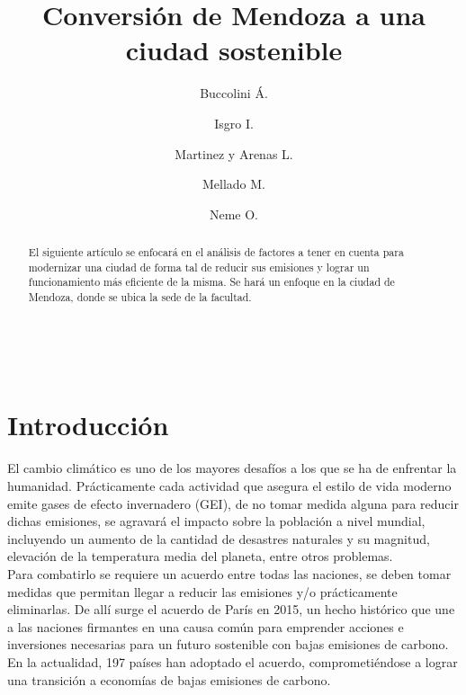\documentclass[runningheads]{llncs}
\begin{document}
%
\title{Conversión de Mendoza a una ciudad sostenible}
%
%
\author{Buccolini Á. \and Isgro I. \and
Martinez y Arenas L. \and Mellado M. \and
Neme O.}
%

%
\\

%
\maketitle        %
%
\begin{abstract}
El siguiente artículo se enfocará en el análisis de factores a tener en cuenta para modernizar una ciudad de forma tal de reducir sus emisiones y lograr un funcionamiento más eficiente de la misma. Se hará un enfoque en la ciudad de Mendoza, donde se ubica la sede de la facultad.


\end{abstract}
%
\section{Introducción}
El cambio climático es uno de los mayores desafíos a los que se ha de enfrentar la humanidad. Prácticamente cada actividad que asegura el estilo de vida moderno emite gases de efecto invernadero (GEI), de no tomar medida alguna para reducir dichas emisiones, se agravará el impacto sobre la población a nivel mundial, incluyendo un aumento de la cantidad de desastres naturales y su magnitud, elevación de la temperatura media del planeta, entre otros problemas.\\

Para combatirlo se requiere un acuerdo entre todas las naciones, se deben tomar medidas que permitan llegar a reducir las emisiones y/o prácticamente eliminarlas. De allí surge el acuerdo de París en 2015, un hecho histórico que une a las naciones firmantes en una causa común para emprender acciones e inversiones necesarias para un futuro sostenible con bajas emisiones de carbono. En la actualidad, 197 países han adoptado el acuerdo, comprometiéndose a lograr una transición a economías de bajas emisiones de carbono.~\cite{ref_url8,ref_url10}\\
\end{document}
